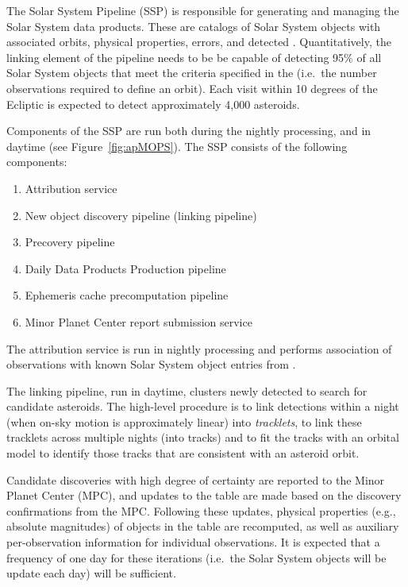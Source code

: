 The Solar System Pipeline (SSP) is responsible for generating and managing the Solar System data products. These are catalogs of Solar System objects with associated orbits, physical properties, errors, and detected \DIASources. Quantitatively, the linking element of the pipeline needs to be be capable of detecting 95\%  of all Solar System objects that meet the criteria specified in the \OSS\@ {} (i.e.\ the number observations required to define an orbit). Each visit within 10 degrees of the Ecliptic is expected to detect approximately 4,000 asteroids.

Components of the SSP are run both during the nightly processing, and in daytime (see Figure~\ref{fig:apMOPS}). The SSP consists of the following components:
%
\begin{enumerate}
	\item Attribution service
	\item New object discovery pipeline (linking pipeline)
	\item Precovery pipeline
	\item Daily Data Products Production pipeline
	\item Ephemeris cache precomputation pipeline
	\item Minor Planet Center report submission service
\end{enumerate}
%
The attribution service is run in nightly processing and performs association of observations with known Solar System object entries from \MPCORB.

The linking pipeline, run in daytime, clusters newly detected \DIAObjects to search for candidate asteroids. The high-level procedure is to link \DIASource detections within a night (when on-sky motion is approximately linear) into {\em tracklets}, to link these tracklets across multiple nights (into tracks) and to fit the tracks with an orbital model to identify those tracks that are consistent with an asteroid orbit.

Candidate discoveries with high degree of certainty are reported to the Minor Planet Center (MPC), and updates to the \MPCORB table are made based on the discovery confirmations from the MPC. Following these updates, physical properties (e.g., absolute magnitudes) of objects in the \SSObject table are recomputed, as well as auxiliary per-observation information for individual observations. It is expected that a frequency of one day for these iterations (i.e.\ the Solar System objects will be update each day) will be sufficient.

